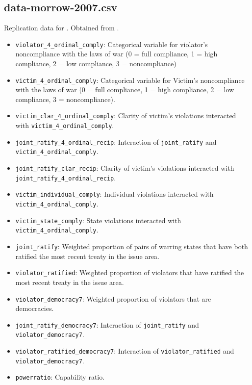 \documentclass[12pt]{article}
\begin{document}
\subsection{data-morrow-2007.csv}

Replication data for \citet{morrow2007}.
Obtained from \citet{morrow2007data}.

\begin{itemize}
  \sloppy
  \item \texttt{violator\_4\_ordinal\_comply}: Categorical variable for violator's noncompliance with the laws of war (0 = full compliance, 1 = high compliance, 2 = low compliance, 3 = noncompliance)
  \item \texttt{victim\_4\_ordinal\_comply}: Categorical variable for Victim's noncompliance with the laws of war (0 = full compliance, 1 = high compliance, 2 = low compliance, 3 = noncompliance).
  \item \texttt{victim\_clar\_4\_ordinal\_comply}: Clarity of victim's violations interacted with \texttt{victim\_4\_ordinal\_comply}.
  \item \texttt{joint\_ratify\_4\_ordinal\_recip}: Interaction of \texttt{joint\_ratify} and \texttt{victim\_4\_ordinal\_comply}.
  \item \texttt{joint\_ratify\_clar\_recip}: Clarity of victim's violations interacted with \texttt{joint\_ratify\_4\_ordinal\_recip}.
  \item \texttt{victim\_individual\_comply}: Individual violations interacted with \texttt{victim\_4\_ordinal\_comply}.
  \item \texttt{victim\_state\_comply}: State violations interacted with \texttt{victim\_4\_ordinal\_comply}.
  \item \texttt{joint\_ratify}: Weighted proportion of pairs of warring states that have both ratified the most recent treaty in the issue area.
  \item \texttt{violator\_ratified}: Weighted proportion of violators that have ratified the most recent treaty in the issue area.
  \item \texttt{violator\_democracy7}: Weighted proportion of violators that are democracies.
  \item \texttt{joint\_ratify\_democracy7}: Interaction of \texttt{joint\_ratify} and \texttt{violator\_democracy7}.
  \item \texttt{violator\_ratified\_democracy7}: Interaction of \texttt{violator\_ratified} and \texttt{violator\_democracy7}.
  \item \texttt{powerratio}: Capability ratio.

\end{itemize}
\end{document}
